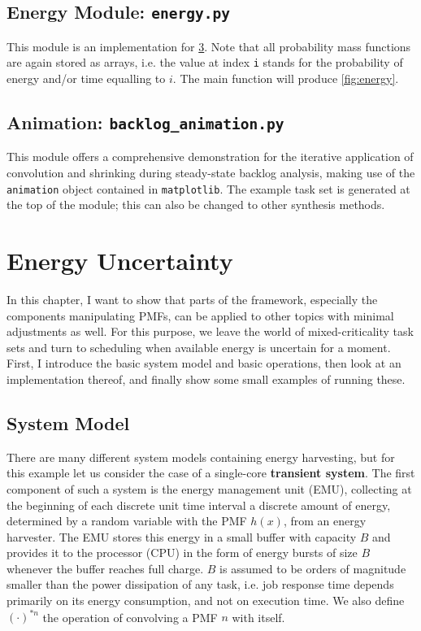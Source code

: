 \documentclass[a4paper,oneside]{csthesis}
\begin{document}
\section{Energy Module: \texttt{energy.py}}
\label{sec:energy-mod}
This module is an implementation for \cref{cha:energy}. Note that all probability mass functions are again stored as arrays, i.e. the value at index \texttt{i} stands for the probability of energy and/or time equalling to $i$. The main function will produce \cref{fig:energy}.

\section{Animation: \texttt{backlog\_animation.py}}
\label{sec:anim-mod}
This module offers a comprehensive demonstration for the iterative application of convolution and shrinking during steady-state backlog analysis, making use of the \texttt{animation} object contained in \texttt{matplotlib}. The example task set is generated at the top of the module; this can also be changed to other synthesis methods.

\chapter{Energy Uncertainty}
\label{cha:energy}
In this chapter, I want to show that parts of the framework, especially the components manipulating PMFs, can be applied to other topics with minimal adjustments as well. For this purpose, we leave the world of mixed-criticality task sets and turn to scheduling when available energy is uncertain for a moment. First, I introduce the basic system model and basic operations, then look at an implementation thereof, and finally show some small examples of running these.

\section{System Model}
There are many different system models containing energy harvesting, but for this example let us consider the case of a single-core \textbf{transient system}. The first component of such a system is the energy management unit (EMU), collecting at the beginning of each discrete unit time interval a discrete amount of energy, determined by a random variable with the PMF $h(x)$, from an energy harvester. The EMU stores this energy in a small buffer with capacity $B$ and provides it to the processor (CPU) in the form of energy bursts of size $B$ whenever the buffer reaches full charge. $B$ is assumed to be orders of magnitude smaller than the power dissipation of any task, i.e. job response time depends primarily on its energy consumption, and not on execution time. We also define $(\cdot)^{*n}$ the operation of convolving a PMF $n$ with itself.
\end{document}
